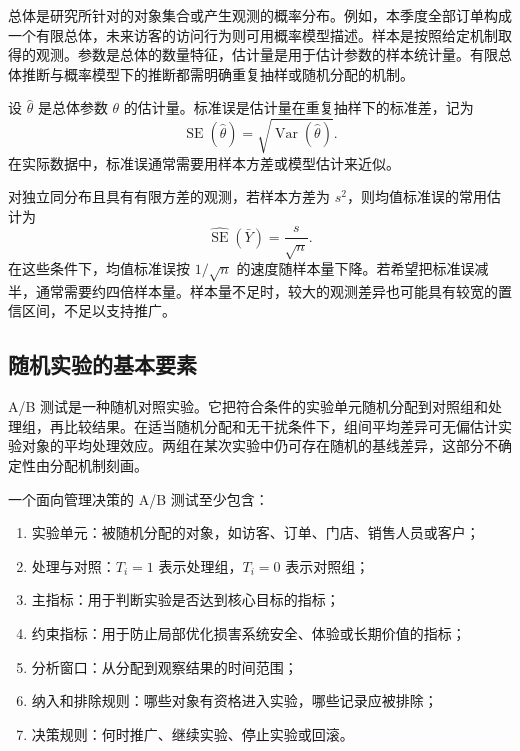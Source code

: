 总体是研究所针对的对象集合或产生观测的概率分布。例如，本季度全部订单构成一个有限总体，未来访客的访问行为则可用概率模型描述。样本是按照给定机制取得的观测。参数是总体的数量特征，估计量是用于估计参数的样本统计量。有限总体推断与概率模型下的推断都需明确重复抽样或随机分配的机制。

\begin{definition}[标准误]
设 \(\hat\theta\) 是总体参数 \(\theta\) 的估计量。标准误是估计量在重复抽样下的标准差，记为
\[
  \operatorname{SE}(\hat\theta)=\sqrt{\operatorname{Var}(\hat\theta)}.
\]
在实际数据中，标准误通常需要用样本方差或模型估计来近似。
\end{definition}

对独立同分布且具有有限方差的观测，若样本方差为 \(s^2\)，则均值标准误的常用估计为
\[
  \widehat{\operatorname{SE}}(\bar Y)=\frac{s}{\sqrt n}.
\]
在这些条件下，均值标准误按 \(1/\sqrt n\) 的速度随样本量下降。若希望把标准误减半，通常需要约四倍样本量。样本量不足时，较大的观测差异也可能具有较宽的置信区间，不足以支持推广。

\subsection{随机实验的基本要素}

A/B 测试是一种随机对照实验。它把符合条件的实验单元随机分配到对照组和处理组，再比较结果。在适当随机分配和无干扰条件下，组间平均差异可无偏估计实验对象的平均处理效应。两组在某次实验中仍可存在随机的基线差异，这部分不确定性由分配机制刻画。

\begin{definition}[A/B 测试的基本元素]
一个面向管理决策的 A/B 测试至少包含：
\begin{enumerate}
  \item 实验单元：被随机分配的对象，如访客、订单、门店、销售人员或客户；
  \item 处理与对照：\(T_i=1\) 表示处理组，\(T_i=0\) 表示对照组；
  \item 主指标：用于判断实验是否达到核心目标的指标；
  \item 约束指标：用于防止局部优化损害系统安全、体验或长期价值的指标；
  \item 分析窗口：从分配到观察结果的时间范围；
  \item 纳入和排除规则：哪些对象有资格进入实验，哪些记录应被排除；
  \item 决策规则：何时推广、继续实验、停止实验或回滚。
\end{enumerate}
\end{definition}

